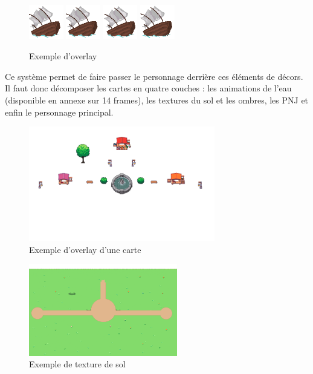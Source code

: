 \documentclass{article}
\begin{document}
\begin{figure}[h]
    \centering
    \includegraphics[height = 1.5cm]{bateau/idle_0.png}
    \includegraphics[height = 1.5cm]{bateau/idle_1.png}
    \includegraphics[height = 1.5cm]{bateau/idle_2.png}
    \includegraphics[height = 1.5cm]{bateau/idle_3.png}
    \caption{Exemple d'overlay}
\end{figure}
Ce système permet de faire passer le personnage derrière ces éléments de décors. Il faut donc décomposer les cartes en quatre couches : les animations de l'eau (disponible en annexe sur 14 frames), les textures du sol et les ombres, les PNJ et enfin le personnage principal.

\begin{figure}[h]
    \centering
    \includegraphics[height = 5cm]{overlay.png}
    \caption{Exemple d'overlay d'une carte}
\end{figure}
\begin{figure}[h]
    \centering
    \includegraphics[height = 4cm]{background_0-1.png}
    \caption{Exemple de texture de sol}
\end{figure}
\newpage
\end{document}
